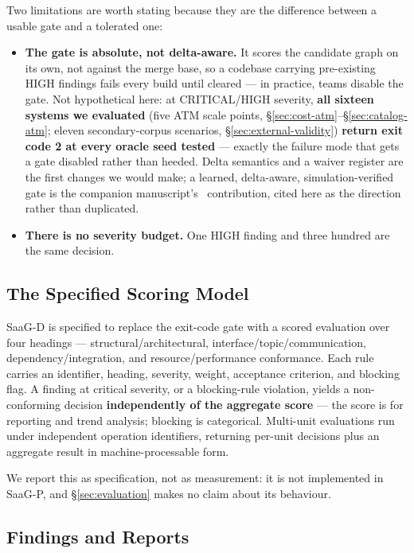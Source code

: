 \documentclass[sigconf,9pt]{acmart}
\begin{document}
Two limitations are worth stating because they are the difference between a usable gate and a
tolerated one:

\begin{itemize}
\item \textbf{The gate is absolute, not delta-aware.} It scores the candidate graph on its own,
  not against the merge base, so a codebase carrying pre-existing HIGH findings fails every build
  until cleared --- in practice, teams disable the gate. Not hypothetical here: at CRITICAL/HIGH
  severity, \textbf{all sixteen systems we evaluated} (five ATM scale points,
  \S\ref{sec:cost-atm}--\S\ref{sec:catalog-atm}; eleven secondary-corpus scenarios,
  \S\ref{sec:external-validity}) \textbf{return exit code 2 at every oracle seed tested} --- exactly
  the failure mode that gets a gate disabled rather than heeded. Delta semantics and a waiver
  register are the first changes we would make; a learned, delta-aware, simulation-verified gate is
  the companion manuscript's~\cite{companion2026} contribution, cited here as the direction rather
  than duplicated.
\item \textbf{There is no severity budget.} One HIGH finding and three hundred are the same
  decision.
\end{itemize}

\subsection{The Specified Scoring Model}
\label{sec:scoringmodel}

SaaG-D is specified to replace the exit-code gate with a scored evaluation over four
headings --- structural/architectural, interface/topic/communication, dependency/integration, and
resource/performance conformance. Each rule carries an identifier, heading, severity, weight,
acceptance criterion, and blocking flag. A finding at critical severity, or a blocking-rule
violation, yields a non-conforming decision \textbf{independently of the aggregate score} --- the
score is for reporting and trend analysis; blocking is categorical. Multi-unit evaluations run
under independent operation identifiers, returning per-unit decisions plus an aggregate result in
machine-processable form.

We report this as specification, not as measurement: it is not implemented in SaaG-P, and
\S\ref{sec:evaluation} makes no claim about its behaviour.

\subsection{Findings and Reports}
\label{sec:findings}
\end{document}
